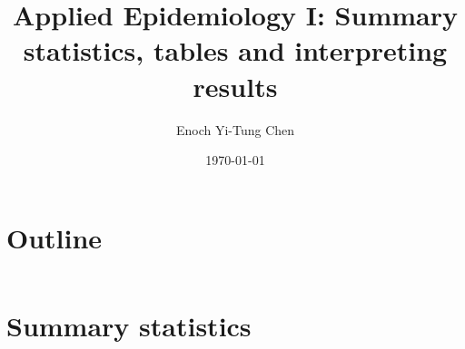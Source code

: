 

\title[Applied Epi I: Interpreting results]{Applied Epidemiology I: Summary statistics, tables and interpreting results}
\date{\today}
\author[Enoch Yi-Tung Chen]{Enoch Yi-Tung Chen}




\begin{frame}
\maketitle 
\end{frame}



\section*{Outline}
\begin{frame}{\secname}
 \begin{columns}[t]
        \begin{column}{.5\textwidth}
            \tableofcontents[sections={1-4}]
        \end{column}
        \begin{column}{.5\textwidth}
            \tableofcontents[sections={5-7}]
        \end{column}
\end{columns}
\end{frame}
\section{Summary statistics}

